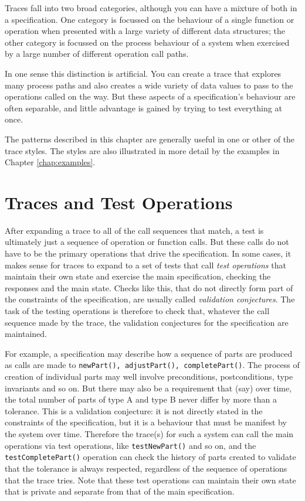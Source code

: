 \documentclass{overturerepchap}
\begin{document}
Traces fall into two broad categories, although you can have a mixture
of both in a specification. One category is focussed on the behaviour of a
single function or operation when presented with a large variety of different
data structures; the other category is focussed on the process behaviour of a
system when exercised by a large number of different operation call paths.

In one sense this distinction is artificial. You can create a trace that
explores many process paths and also creates a wide variety of data values to
pass to the operations called on the way. But these aspects of a specification's
behaviour are often separable, and little advantage is gained by trying to test
everything at once. 

The patterns described in this chapter are generally useful in one or other of
the trace styles. The styles are also illustrated in more detail by the
examples in Chapter \ref{chap:examples}.

\section{Traces and Test Operations}
\label{chap:testops}

After expanding a trace to all of the call sequences that match, a
test is ultimately just a sequence of operation or function calls. But these
calls do not have to be the primary operations that drive the specification. In
some cases, it makes sense for traces to expand to a set of tests that call
\emph{test operations} that maintain their own state and exercise the main
specification, checking the responses and the main state. Checks like this, that
do not directly form part of the constraints of the specification, are usually
called \emph{validation conjectures}. The task of the testing operations is
therefore to check that, whatever the call sequence made by the trace, the
validation conjectures for the specification are maintained.

For example, a specification may describe how a sequence of parts are produced
as calls are made to \texttt{newPart(), adjustPart(), completePart()}. The
process of creation of individual parts may well involve preconditions,
postconditions, type invariants and so on. But there may also be a requirement
that (say) over time, the total number of parts of type A and type B never
differ by more than a tolerance. This is a validation conjecture: it is not
directly stated in the constraints of the specification, but it is a behaviour
that must be manifest by the system over time. Therefore the trace(s) for such
a system can call the main operations via test operations, like
\texttt{testNewPart()} and so on, and the \texttt{testCompletePart()} operation
can check the history of parts created to validate that the tolerance is always
respected, regardless of the sequence of operations that the trace tries. Note
that these test operations can maintain their own state that is private and
separate from that of the main specification.
\end{document}
